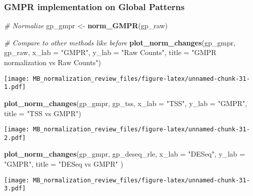 \documentclass[
]{book}
\newenvironment{Shaded}{\begin{snugshade}}{\end{snugshade}}
\newcommand{\CommentTok}[1]{\textcolor[rgb]{0.56,0.35,0.01}{\textit{#1}}}
\newcommand{\DataTypeTok}[1]{\textcolor[rgb]{0.13,0.29,0.53}{#1}}
\newcommand{\KeywordTok}[1]{\textcolor[rgb]{0.13,0.29,0.53}{\textbf{#1}}}
\newcommand{\NormalTok}[1]{#1}
\newcommand{\StringTok}[1]{\textcolor[rgb]{0.31,0.60,0.02}{#1}}
\begin{document}
\hypertarget{gmpr-implementation-on-global-patterns}{%
\subsubsection{GMPR implementation on Global Patterns}\label{gmpr-implementation-on-global-patterns}}

\begin{Shaded}
\begin{Highlighting}[]
\CommentTok{\# Normalize}
\NormalTok{gp\_gmpr \textless{}{-}}\StringTok{ }\KeywordTok{norm\_GMPR}\NormalTok{(gp\_raw)}

\CommentTok{\# Compare to other methods like before}
\KeywordTok{plot\_norm\_changes}\NormalTok{(gp\_gmpr, gp\_raw,}
                  \DataTypeTok{x\_lab =} \StringTok{"GMPR"}\NormalTok{, }\DataTypeTok{y\_lab =} \StringTok{"Raw Counts"}\NormalTok{,}
                  \DataTypeTok{title =} \StringTok{"GMPR normalization vs Raw Counts"}\NormalTok{)}
\end{Highlighting}
\end{Shaded}

\texttt{[image: MB\_normalization\_review\_files/figure-latex/unnamed-chunk-31-1.pdf]}

\begin{Shaded}
\begin{Highlighting}[]
\KeywordTok{plot\_norm\_changes}\NormalTok{(gp\_gmpr, gp\_tss,}
                  \DataTypeTok{x\_lab =} \StringTok{"TSS"}\NormalTok{, }\DataTypeTok{y\_lab =} \StringTok{"GMPR"}\NormalTok{,}
                  \DataTypeTok{title =} \StringTok{"TSS vs GMPR"}\NormalTok{)}
\end{Highlighting}
\end{Shaded}

\texttt{[image: MB\_normalization\_review\_files/figure-latex/unnamed-chunk-31-2.pdf]}

\begin{Shaded}
\begin{Highlighting}[]
\KeywordTok{plot\_norm\_changes}\NormalTok{(gp\_gmpr, gp\_deseq\_rle,}
                  \DataTypeTok{x\_lab =} \StringTok{"DESeq"}\NormalTok{, }\DataTypeTok{y\_lab =} \StringTok{"GMPR"}\NormalTok{,}
                  \DataTypeTok{title =} \StringTok{"DESeq vs GMPR"}\NormalTok{ )}
\end{Highlighting}
\end{Shaded}

\texttt{[image: MB\_normalization\_review\_files/figure-latex/unnamed-chunk-31-3.pdf]}
\end{document}
